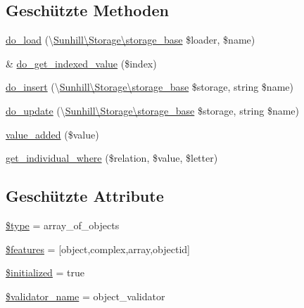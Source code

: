 \subsection*{Geschützte Methoden}
\begin{DoxyCompactItemize}
\item 
\hyperlink{classSunhill_1_1Properties_1_1oo__property__array__of__objects_aa689f4073f08af91b6a11510dc59149d}{do\+\_\+load} (\textbackslash{}\hyperlink{classSunhill_1_1Storage_1_1storage__base}{Sunhill\textbackslash{}\+Storage\textbackslash{}storage\+\_\+base} \$loader, \$name)
\item 
\& \hyperlink{classSunhill_1_1Properties_1_1oo__property__array__of__objects_a388ce16fca8d6895b31eedb136be639b}{do\+\_\+get\+\_\+indexed\+\_\+value} (\$index)
\item 
\hyperlink{classSunhill_1_1Properties_1_1oo__property__array__of__objects_a15a438fc6d2570e4bb1e1e03cb7af51b}{do\+\_\+insert} (\textbackslash{}\hyperlink{classSunhill_1_1Storage_1_1storage__base}{Sunhill\textbackslash{}\+Storage\textbackslash{}storage\+\_\+base} \$storage, string \$name)
\item 
\hyperlink{classSunhill_1_1Properties_1_1oo__property__array__of__objects_a6c6a90812a3bd29fdd373b6bf3fb5e0e}{do\+\_\+update} (\textbackslash{}\hyperlink{classSunhill_1_1Storage_1_1storage__base}{Sunhill\textbackslash{}\+Storage\textbackslash{}storage\+\_\+base} \$storage, string \$name)
\item 
\hyperlink{classSunhill_1_1Properties_1_1oo__property__array__of__objects_a2563f1ce387796cb6add9bdb06981e4b}{value\+\_\+added} (\$value)
\item 
\hyperlink{classSunhill_1_1Properties_1_1oo__property__array__of__objects_a1c0e01271cb7d2e5151562d247140048}{get\+\_\+individual\+\_\+where} (\$relation, \$value, \$letter)
\end{DoxyCompactItemize}
\subsection*{Geschützte Attribute}
\begin{DoxyCompactItemize}
\item 
\hyperlink{classSunhill_1_1Properties_1_1oo__property__array__of__objects_a6a2d05cadf2238c865a0914b630d0994}{\$type} = \textquotesingle{}array\+\_\+of\+\_\+objects\textquotesingle{}
\item 
\hyperlink{classSunhill_1_1Properties_1_1oo__property__array__of__objects_a96c1ac8771080da70c10110bf5097054}{\$features} = \mbox{[}\textquotesingle{}object\textquotesingle{},\textquotesingle{}complex\textquotesingle{},\textquotesingle{}array\textquotesingle{},\textquotesingle{}objectid\textquotesingle{}\mbox{]}
\item 
\hyperlink{classSunhill_1_1Properties_1_1oo__property__array__of__objects_a7a43c8ef723104d2ecc2fdcc0764c549}{\$initialized} = true
\item 
\hyperlink{classSunhill_1_1Properties_1_1oo__property__array__of__objects_a4846a212c679a83f6f9b349919d8d923}{\$validator\+\_\+name} = \textquotesingle{}object\+\_\+validator\textquotesingle{}
\end{DoxyCompactItemize}



